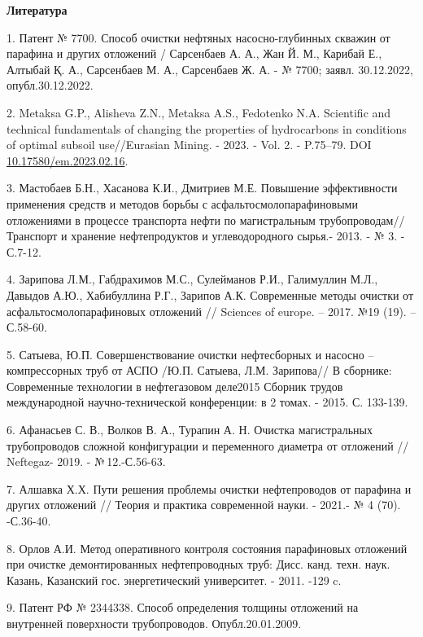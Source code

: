\begin{center}
{\bfseries Литература}
\end{center}

\begin{refs}
1. Патент № 7700. Способ очистки нефтяных насосно-глубинных скважин от
парафина и других отложений / Сарсенбаев А. А., Жан Й. М., Карибай Е.,
Алтыбай Қ. А., Сарсенбаев М. А., Сарсенбаев Ж. А. - № 7700; заявл.
30.12.2022, опубл.30.12.2022.

2. Metaksa G.P., Alisheva Z.N., Metaksa A.S., Fedotenko N.A. Scientific
and technical fundamentals of changing the properties of hydrocarbons
in conditions of optimal subsoil use//Eurasian Mining. - 2023. - Vol.
2. - P.75--79. DOI
\href{https://doi.org/10.17580/em.2023.02.16}{10.17580/em.2023.02.16}.

3. Мастобаев Б.Н., Хасанова К.И., Дмитриев М.Е. Повышение эффективности
применения средств и методов борьбы с асфальтосмолопарафиновыми
отложениями в процессе транспорта нефти по магистральным
трубопроводам//Транспорт и хранение нефтепродуктов и углеводородного
сырья.- 2013. - № 3. - С.7-12.

4. Зарипова Л.М., Габдрахимов М.С., Сулейманов Р.И., Галимуллин М.Л.,
Давыдов А.Ю., Хабибуллина Р.Г., Зарипов А.К. Современные методы очистки
от асфальтосмолопарафиновых отложений // Sciences of europe. -- 2017.
№19 (19). -- С.58-60.

5. Сатыева, Ю.П. Совершенствование очистки нефтесборных и насосно
--компрессорных труб от АСПО /Ю.П. Сатыева, Л.М. Зарипова// В сборнике:
Современные технологии в нефтегазовом деле2015 Сборник трудов
международной научно-технической конференции: в 2 томах. - 2015. С.
133-139.

6. Афанасьев С. В., Волков В. А., Турапин А. Н. Очистка магистральных
трубопроводов сложной конфигурации и переменного диаметра от отложений
// Neftegaz- 2019. - №\,12.-С.56-63.

7. Алшавка Х.Х. Пути решения проблемы очистки нефтепроводов от парафина и
других отложений // Теория и практика современной науки. - 2021.- № 4
(70). -С.36-40.

8. Орлов А.И. Метод оперативного контроля состояния парафиновых
отложений при очистке демонтированных нефтепроводных труб: Дисс. канд.
техн. наук. Казань, Казанский гос. энергетический университет. - 2011.
-129 c.

9. Патент РФ № 2344338. Способ определения толщины отложений на
внутренней поверхности трубопроводов. Опубл.20.01.2009.


\end{refs}
